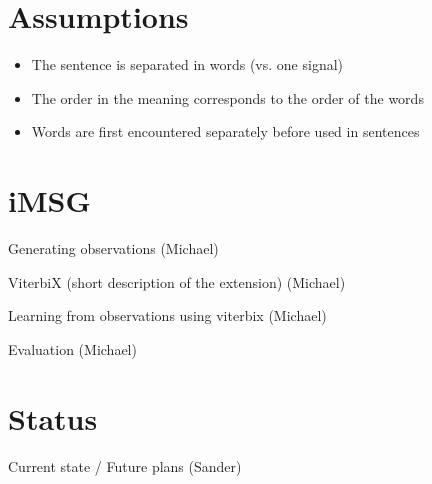 \documentclass[11pt,a4paper,xcolor=dvipsnames]{beamer}
\begin{document}
\section{Assumptions}
\begin{frame}
\begin{itemize}
  \item The sentence is separated in words (vs. one signal)
  \item The order in the meaning corresponds to the order of the words
  \item Words are first encountered separately before used in sentences
\end{itemize}
\end{frame}

\section{iMSG}
\begin{frame}
  Generating observations (Michael)
\end{frame}

\begin{frame}
  ViterbiX (short description of the extension) (Michael)
\end{frame}

\begin{frame}
  Learning from observations using viterbix (Michael)
\end{frame}

\begin{frame}
  Evaluation (Michael)
\end{frame}

\section{Status}
\begin{frame}
  Current state / Future plans (Sander)
\end{frame}
\end{document}
